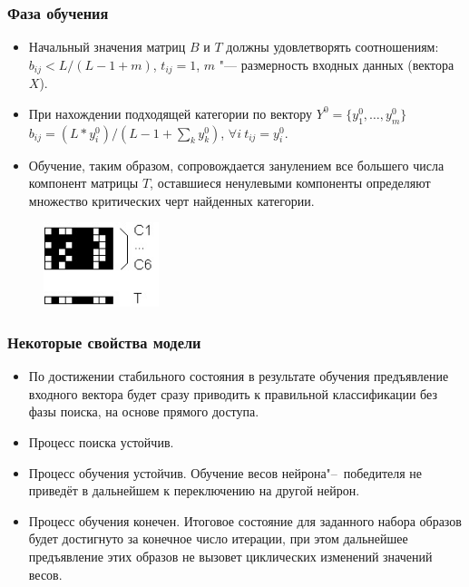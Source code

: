 \documentclass[default]{beamer}
\begin{document}
	\begin{frame}
		\frametitle{Фаза обучения}
		
		\begin{itemize}
			\item Начальный значения матриц $B$ и $T$ должны удовлетворять соотношениям: $b_{ij}<L/(L-1+m)$, $t_{ij}=1$, $m$ "--- размерность входных данных (вектора $X$).
			\item При нахождении подходящей категории по вектору $Y^0=\{y_1^0,\dots,y_m^0\}$ $b_{ij}=(L*y_i^0)/(L-1+\sum_k y_k^0)$, $\forall i\ t_{ij}=y_i^0$.
			\item Обучение, таким образом, сопровождается занулением все большего числа компонент матрицы $T$, оставшиеся ненулевыми компоненты определяют множество критических черт найденных категории.
		\end{itemize}
		\begin{figure}
			\includegraphics[width=0.3\textwidth]{art_learn}
		\end{figure}
	\end{frame}

	\begin{frame}
		\frametitle{Некоторые свойства модели}
		
		\begin{itemize}
			\item По достижении стабильного состояния в результате обучения предъявление входного вектора будет сразу приводить к правильной классификации без фазы поиска, на основе прямого доступа.
			\item Процесс поиска устойчив.
			\item Процесс обучения устойчив. Обучение весов нейрона"--~победителя не приведёт в дальнейшем к переключению на другой нейрон.
			\item Процесс обучения конечен. Итоговое состояние для заданного набора образов будет достигнуто за конечное число итерации, при этом дальнейшее предъявление этих образов не вызовет циклических изменений значений весов.
		\end{itemize}
	\end{frame}
	
\end{document}

